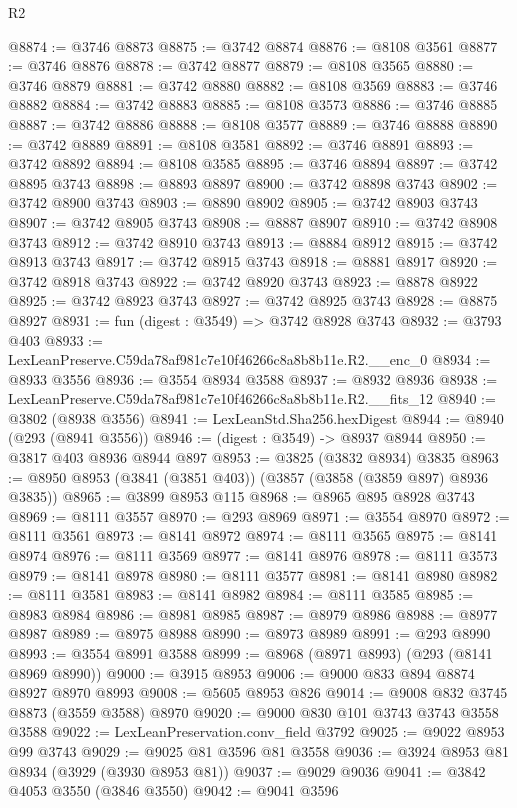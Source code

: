\begin{lexlean}{R2}
\begin{coremodule}
@8874 := @3746 @8873
@8875 := @3742 @8874
@8876 := @8108 @3561
@8877 := @3746 @8876
@8878 := @3742 @8877
@8879 := @8108 @3565
@8880 := @3746 @8879
@8881 := @3742 @8880
@8882 := @8108 @3569
@8883 := @3746 @8882
@8884 := @3742 @8883
@8885 := @8108 @3573
@8886 := @3746 @8885
@8887 := @3742 @8886
@8888 := @8108 @3577
@8889 := @3746 @8888
@8890 := @3742 @8889
@8891 := @8108 @3581
@8892 := @3746 @8891
@8893 := @3742 @8892
@8894 := @8108 @3585
@8895 := @3746 @8894
@8897 := @3742 @8895 @3743
@8898 := @8893 @8897
@8900 := @3742 @8898 @3743
@8902 := @3742 @8900 @3743
@8903 := @8890 @8902
@8905 := @3742 @8903 @3743
@8907 := @3742 @8905 @3743
@8908 := @8887 @8907
@8910 := @3742 @8908 @3743
@8912 := @3742 @8910 @3743
@8913 := @8884 @8912
@8915 := @3742 @8913 @3743
@8917 := @3742 @8915 @3743
@8918 := @8881 @8917
@8920 := @3742 @8918 @3743
@8922 := @3742 @8920 @3743
@8923 := @8878 @8922
@8925 := @3742 @8923 @3743
@8927 := @3742 @8925 @3743
@8928 := @8875 @8927
@8931 := fun (digest : @3549) => @3742 @8928 @3743
@8932 := @3793 @403
@8933 := LexLeanPreserve.C59da78af981c7e10f46266c8a8b8b11e.R2.__enc_0
@8934 := @8933 @3556
@8936 := @3554 @8934 @3588
@8937 := @8932 @8936
@8938 := LexLeanPreserve.C59da78af981c7e10f46266c8a8b8b11e.R2.__fits_12
@8940 := @3802 (@8938 @3556)
@8941 := LexLeanStd.Sha256.hexDigest
@8944 := @8940 (@293 (@8941 @3556))
@8946 := (digest : @3549) -> @8937 @8944
@8950 := @3817 @403 @8936 @8944 @897
@8953 := @3825 (@3832 @8934) @3835
@8963 := @8950 @8953 (@3841 (@3851 @403)) (@3857 (@3858 (@3859 @897) @8936 @3835))
@8965 := @3899 @8953 @115
@8968 := @8965 @895 @8928 @3743
@8969 := @8111 @3557
@8970 := @293 @8969
@8971 := @3554 @8970
@8972 := @8111 @3561
@8973 := @8141 @8972
@8974 := @8111 @3565
@8975 := @8141 @8974
@8976 := @8111 @3569
@8977 := @8141 @8976
@8978 := @8111 @3573
@8979 := @8141 @8978
@8980 := @8111 @3577
@8981 := @8141 @8980
@8982 := @8111 @3581
@8983 := @8141 @8982
@8984 := @8111 @3585
@8985 := @8983 @8984
@8986 := @8981 @8985
@8987 := @8979 @8986
@8988 := @8977 @8987
@8989 := @8975 @8988
@8990 := @8973 @8989
@8991 := @293 @8990
@8993 := @3554 @8991 @3588
@8999 := @8968 (@8971 @8993) (@293 (@8141 @8969 @8990))
@9000 := @3915 @8953
@9006 := @9000 @833 @894 @8874 @8927 @8970 @8993
@9008 := @5605 @8953 @826
@9014 := @9008 @832 @3745 @8873 (@3559 @3588) @8970
@9020 := @9000 @830 @101 @3743 @3743 @3558 @3588
@9022 := LexLeanPreservation.conv_field @3792
@9025 := @9022 @8953 @99 @3743
@9029 := @9025 @81 @3596 @81 @3558
@9036 := @3924 @8953 @81 @8934 (@3929 (@3930 @8953 @81))
@9037 := @9029 @9036
@9041 := @3842 @4053 @3550 (@3846 @3550)
@9042 := @9041 @3596

\end{coremodule}
\end{lexlean}
